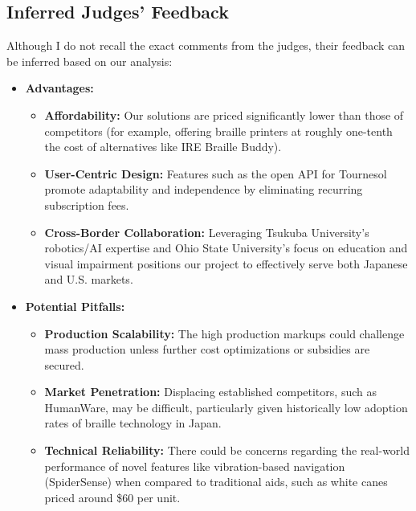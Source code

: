 \documentclass[12pt,a4paper]{article}
\begin{document}
\subsection{Inferred Judges' Feedback}
Although I do not recall the exact comments from the judges, their feedback can be inferred based on our analysis:
\begin{itemize}[leftmargin=*, label=\textbullet]
    \item \textbf{Advantages:}
    \begin{itemize}[leftmargin=*, label=--]
        \item \textbf{Affordability:} Our solutions are priced significantly lower than those of competitors (for example, offering braille printers at roughly one-tenth the cost of alternatives like IRE Braille Buddy).
        \item \textbf{User-Centric Design:} Features such as the open API for Tournesol promote adaptability and independence by eliminating recurring subscription fees.
        \item \textbf{Cross-Border Collaboration:} Leveraging Tsukuba University's robotics/AI expertise and Ohio State University's focus on education and visual impairment positions our project to effectively serve both Japanese and U.S. markets.
    \end{itemize}
    \item \textbf{Potential Pitfalls:}
    \begin{itemize}[leftmargin=*, label=--]
        \item \textbf{Production Scalability:} The high production markups could challenge mass production unless further cost optimizations or subsidies are secured.
        \item \textbf{Market Penetration:} Displacing established competitors, such as HumanWare, may be difficult, particularly given historically low adoption rates of braille technology in Japan.
        \item \textbf{Technical Reliability:} There could be concerns regarding the real-world performance of novel features like vibration-based navigation (SpiderSense) when compared to traditional aids, such as white canes priced around \$60 per unit.
    \end{itemize}
\end{itemize}
\end{document}
